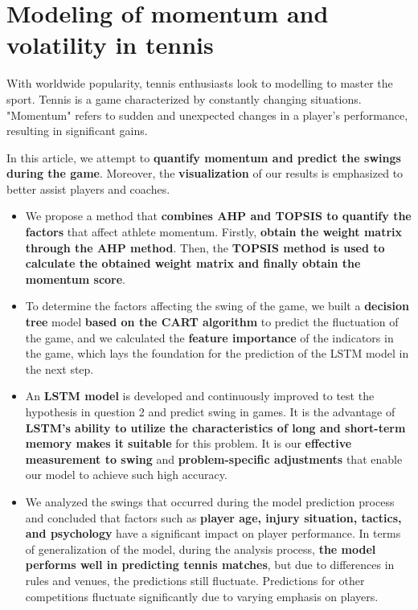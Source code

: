 \thispagestyle{empty}

\section*{\centering Modeling of momentum and volatility in tennis}
With worldwide popularity, tennis enthusiasts look to modelling to master the sport. Tennis is a game characterized by constantly changing situations. "Momentum" refers to sudden and unexpected changes in a player's performance, resulting in significant gains. \par

In this article, we attempt to \textbf{quantify momentum and predict the swings during the game}. Moreover, the \textbf{visualization} of our results is emphasized to better assist players and coaches.

\begin{itemize}
    \item We propose a method that \textbf{combines AHP and TOPSIS to quantify the factors} that affect athlete momentum. Firstly, \textbf{obtain the weight matrix through the AHP method}. Then, the \textbf{TOPSIS method is used to calculate the obtained weight matrix and finally obtain the momentum score}.

    \item To determine the factors affecting the swing of the game, we built a \textbf{decision tree} model \textbf{based on the CART algorithm} to predict the fluctuation of the game, and we calculated the \textbf{feature importance} of the indicators in the game, which lays the foundation for the prediction of the LSTM model in the next step.

     \item An \textbf{LSTM model} is developed and continuously improved to test the hypothesis in question 2 and predict swing in games. It is the advantage of \textbf{LSTM's ability to utilize the characteristics of long and short-term memory makes it suitable} for this problem. It is our \textbf{effective measurement to swing} and \textbf{problem-specific adjustments} that enable our model to achieve such high accuracy.

     \item We analyzed the swings that occurred during the model prediction process and concluded that factors such as \textbf{player age, injury situation, tactics, and psychology} have a significant impact on player performance. In terms of generalization of the model, during the analysis process, \textbf{the model performs well in predicting tennis matches}, but due to differences in rules and venues, the predictions still fluctuate. Predictions for other competitions fluctuate significantly due to varying emphasis on players.

\end{itemize}

